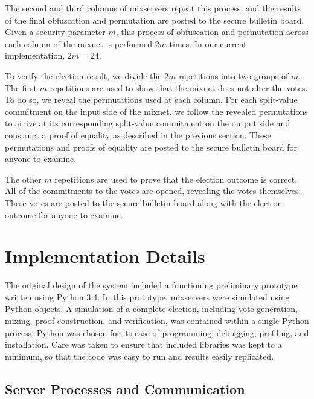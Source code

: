 The second and third columns of mixservers repeat this process, and the results of the final obfuscation and permutation are posted to the secure bulletin board. Given a security parameter $m$, this process of obfuscation and permutation across each column of the mixnet is performed $2m$ times. In our current implementation, $2m = 24$.

To verify the election result, we divide the $2m$ repetitions into two groups of $m$. The first $m$ repetitions are used to show that the mixnet does not alter the votes. To do so, we reveal the permutations used at each column. For each split-value commitment on the input side of the mixnet, we follow the revealed permutations to arrive at its corresponding split-value commitment on the output side and construct a proof of equality as described in the previous section. These permutations and proofs of equality are posted to the secure bulletin board for anyone to examine.

The other $m$ repetitions are used to prove that the election outcome is correct. All of the commitments to the votes are opened, revealing the votes themselves. These votes are posted to the secure bulletin board along with the election outcome for anyone to examine.

\section{Implementation Details} \label{sv:implementation}

The original design of the system included a functioning preliminary prototype written using Python 3.4. In this prototype, mixservers were simulated using Python objects. A simulation of a complete election, including vote generation, mixing, proof construction, and verification, was contained within a single Python process. Python was chosen for its ease of programming, debugging, profiling, and installation. Care was taken to ensure that included libraries was kept to a minimum, so that the code was easy to run and results easily replicated.

\subsection{Server Processes and Communication} \label{sv:implementation:comm}

